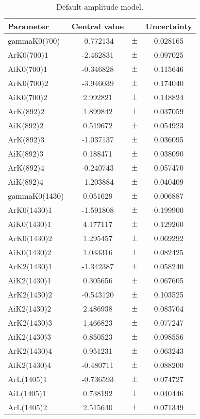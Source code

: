 \begin{table}
\centering
\caption{Default amplitude model.\label{tab:default_model}}
\begin{tiny}
\begin{tabular}{lccc}
\toprule
Parameter & Central value & & Uncertainty\\
\midrule 
gammaK0(700) & -0.772134 & $\pm$ & 0.028165 \\
ArK0(700)1 & -2.462831 & $\pm$ & 0.097025 \\
AiK0(700)1 & -0.346828 & $\pm$ & 0.115646 \\
ArK0(700)2 & -3.946039 & $\pm$ & 0.174040 \\
AiK0(700)2 & 2.992821 & $\pm$ & 0.148824 \\
ArK(892)2 & 1.899842 & $\pm$ & 0.037059 \\
AiK(892)2 & 0.519672 & $\pm$ & 0.054923 \\
ArK(892)3 & -1.037137 & $\pm$ & 0.036095 \\
AiK(892)3 & 0.188471 & $\pm$ & 0.038090 \\
ArK(892)4 & -0.240743 & $\pm$ & 0.057470 \\
AiK(892)4 & -1.203884 & $\pm$ & 0.040409 \\
gammaK0(1430) & 0.051629 & $\pm$ & 0.006887 \\
ArK0(1430)1 & -1.591808 & $\pm$ & 0.199900 \\
AiK0(1430)1 & 4.177117 & $\pm$ & 0.129260 \\
ArK0(1430)2 & 1.295457 & $\pm$ & 0.069292 \\
AiK0(1430)2 & 1.033316 & $\pm$ & 0.082425 \\
ArK2(1430)1 & -1.342387 & $\pm$ & 0.058240 \\
AiK2(1430)1 & 0.305656 & $\pm$ & 0.067605 \\
ArK2(1430)2 & -0.543120 & $\pm$ & 0.103525 \\
AiK2(1430)2 & 2.486938 & $\pm$ & 0.083704 \\
ArK2(1430)3 & 1.466823 & $\pm$ & 0.077247 \\
AiK2(1430)3 & 0.850523 & $\pm$ & 0.098556 \\
ArK2(1430)4 & 0.951231 & $\pm$ & 0.063243 \\
AiK2(1430)4 & -0.480711 & $\pm$ & 0.088200 \\
ArL(1405)1 & -0.736593 & $\pm$ & 0.074727 \\
AiL(1405)1 & 0.738192 & $\pm$ & 0.040446 \\
ArL(1405)2 & 2.515640 & $\pm$ & 0.071349 \\

\end{tabular}
\end{tiny}
\end{table}
